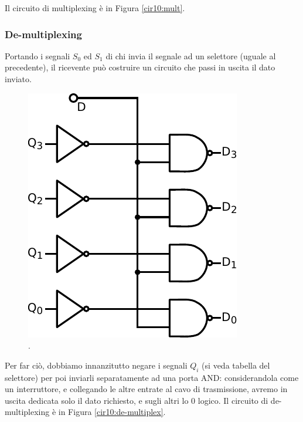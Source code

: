 Il circuito di multiplexing è in Figura \ref{cir10:mult}.

\subsubsection{De-multiplexing}

Portando i segnali $S_0$ ed $S_1$ di chi invia il segnale ad un selettore (uguale al precedente), il ricevente può costruire un circuito che passi in uscita il dato inviato.

\begin{figure}
\centering
\includegraphics[width=.25\textwidth]{../E10/latex/demult.pdf}
\caption{.}
\label{cir10:demult}
\end{figure}

Per far ciò, dobbiamo innanzitutto negare i segnali $Q_i$ (si veda tabella del selettore) per poi inviarli separatamente ad una porta AND: considerandola come un interruttore, e collegando le altre entrate al cavo di trasmissione, avremo in uscita dedicata solo il dato richiesto, e sugli altri lo 0 logico. Il circuito di de-multiplexing è in Figura \ref{cir10:de-multiplex}.